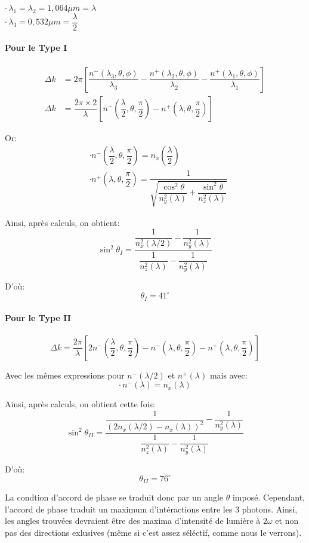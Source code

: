 \documentclass[a4paper,11pt]{report}
\begin{document}
\indent$\cdot\,\lambda_1=\lambda_2=1,064\mu m=\lambda$\\
\indent$\cdot\,\lambda_3=0,532\mu m=\dfrac{\lambda}{2}$\\

\paragraph{Pour le Type I}
\begin{align*}
\Delta k&=2\pi\left[\dfrac{n^-(\lambda_3,\theta,\phi)}{\lambda_3}-\dfrac{n^+(\lambda_2,\theta,\phi)}{\lambda_2}-\dfrac{n^+(\lambda_1,\theta,\phi)}{\lambda_1}\right]\\
\Delta k&=\dfrac{2\pi\times 2}{\lambda}\left[n^-\left(\dfrac{\lambda}{2},\theta,\dfrac{\pi}{2}\right)-n^+\left(\lambda,\theta,\dfrac{\pi}{2}\right)\right]
\end{align*}

Or: 
\begin{align*}
    &\cdot n^-\left(\dfrac{\lambda}{2},\theta,\dfrac{\pi}{2}\right)=n_x\left(\dfrac{\lambda}{2}\right)\\
    &\cdot n^+\left(\lambda,\theta,\dfrac{\pi}{2}\right)=\dfrac{1}{\sqrt{\dfrac{\cos^2\theta}{n_y^2(\lambda)}+\dfrac{\sin^2\theta}{n_z^2(\lambda)}}}
\end{align*}

Ainsi, après calculs, on obtient: 
\[\sin^2\theta_{I}=\dfrac{\dfrac{1}{n_x^2(\lambda/2)}-\dfrac{1}{n_y^2(\lambda)}}{\dfrac{1}{n_z^2(\lambda)}-\dfrac{1}{n_y^2(\lambda)}}\]

D'où: 
\[\theta_{I}=41^{\circ}\]

\paragraph{Pour le Type II}
\[\Delta k=\dfrac{2\pi}{\lambda}\left[2n^-\left(\dfrac{\lambda}{2},\theta,\dfrac{\pi}{2}\right)-n^-\left(\lambda,\theta,\dfrac{\pi}{2}\right)-n^+\left(\lambda,\theta,\dfrac{\pi}{2}\right)\right]\]

Avec les mêmes expressions pour $n^-(\lambda/2)$ et $n^+(\lambda)$ mais avec:
\[\cdot\,n^-(\lambda)=n_x(\lambda)\]

Ainsi, après calculs, on obtient cette fois:
\[\sin^2\theta_{II}=\dfrac{\dfrac{1}{(2n_x(\lambda/2)-n_x(\lambda))^2}-\dfrac{1}{n_y^2(\lambda)}}{\dfrac{1}{n_z^2(\lambda)}-\dfrac{1}{n_y^2(\lambda)}}\]

D'où:
\[\theta_{II}=76^{\circ}\]

La condtion d'accord de phase se traduit donc par un angle $\theta$ imposé. Cependant, l'accord de phase traduit un maximum d'intéractions entre les 3 photons. Ainsi, les angles trouvées devraient être des maxima d'intensité de lumière à $2\omega$ et non pas des directions exlusives (même si c'est assez séléctif, comme nous le verrons).
\end{document}
